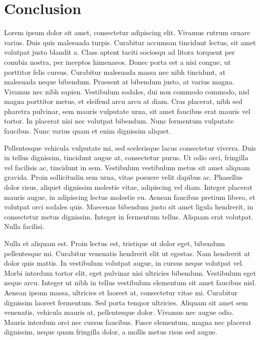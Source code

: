 \documentclass[a4paper,12pt,twoside,openright]{report}
\numberwithin{equation}{section}
\begin{document}
\chapter*{Conclusion} \thispagestyle{chapterpage}
Lorem ipsum dolor sit amet, consectetur adipiscing elit. Vivamus rutrum ornare varius. Duis quis malesuada turpis. Curabitur accumsan tincidunt lectus, sit amet volutpat justo blandit a. Class aptent taciti sociosqu ad litora torquent per conubia nostra, per inceptos himenaeos. Donec porta est a nisi congue, ut porttitor felis cursus. Curabitur malesuada massa nec nibh tincidunt, at malesuada neque bibendum. Praesent at bibendum justo, at varius magna. Vivamus nec nibh sapien. Vestibulum sodales, dui non commodo commodo, nisl magna porttitor metus, et eleifend arcu arcu at diam. Cras placerat, nibh sed pharetra pulvinar, sem mauris vulputate urna, sit amet faucibus erat mauris vel tortor. In placerat nisi nec volutpat bibendum. Nunc fermentum vulputate faucibus. Nunc varius quam et enim dignissim aliquet.

Pellentesque vehicula vulputate mi, sed scelerisque lacus consectetur viverra. Duis in tellus dignissim, tincidunt augue at, consectetur purus. Ut odio orci, fringilla vel facilisis ac, tincidunt in sem. Vestibulum vestibulum metus sit amet aliquam gravida. Proin sollicitudin sem urna, vitae posuere velit dapibus ac. Phasellus dolor risus, aliquet dignissim molestie vitae, adipiscing vel diam. Integer placerat mauris augue, in adipiscing lectus molestie eu. Aenean faucibus pretium libero, et volutpat orci sodales quis. Maecenas bibendum justo sit amet ligula hendrerit, in consectetur metus dignissim. Integer in fermentum tellus. Aliquam erat volutpat. Nulla facilisi.

Nulla et aliquam est. Proin lectus est, tristique ut dolor eget, bibendum pellentesque mi. Curabitur venenatis hendrerit elit ut egestas. Nam hendrerit at dolor quis mattis. In vestibulum volutpat augue, in cursus neque volutpat vel. Morbi interdum tortor elit, eget pulvinar nisi ultricies bibendum. Vestibulum eget neque arcu. Integer ut nibh in tellus vestibulum elementum sit amet faucibus nisl. Aenean ipsum massa, ultricies et laoreet at, consectetur vitae mi. Curabitur dignissim laoreet fermentum. Sed porta tempor ultricies. Aliquam sit amet sem venenatis, vehicula mauris at, pellentesque dolor. Vivamus nec augue odio. Mauris interdum orci nec cursus faucibus. Fusce elementum, magna nec placerat dignissim, neque quam fringilla dolor, a mollis metus risus sed augue.
\end{document}
